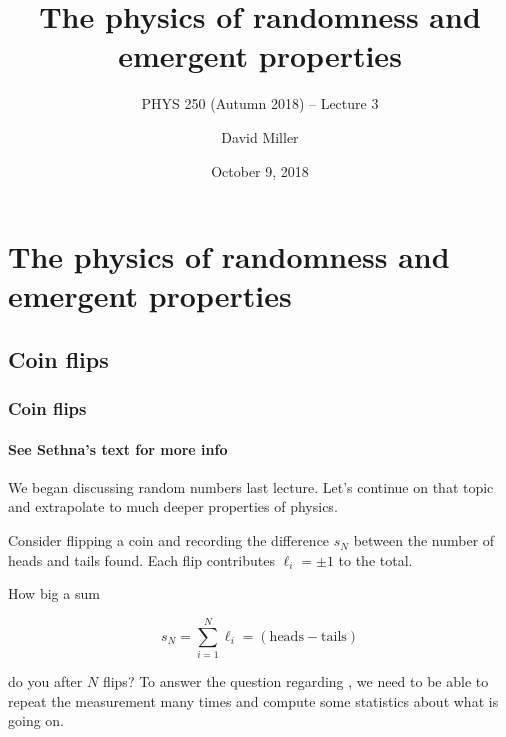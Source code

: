 \documentclass[hyperref={colorlinks=true}]{beamer}
\title[PHYS 250 (Autumn 2018) -- Lecture 3]{The physics of randomness and emergent properties}
\subtitle{PHYS 250 (Autumn 2018) -- Lecture 3}
\author[D.W.~Miller]{David Miller}
\institute[EFI, Chicago] 
{
  Department of Physics and the Enrico Fermi Institute\\
  University of Chicago
}
\date[October 9, 2018]{October 9, 2018}
\begin{document}

{
\begin{frame}
  \titlepage
\end{frame}
}

\section[The physics of randomness and emergent properties]{The physics of randomness and emergent properties}

\subsection[Coin flips]{Coin flips}

\begin{frame}%
  \frametitle{Coin flips}
  \framesubtitle{See Sethna's text for more info}
  
  We began discussing random numbers last lecture. Let's continue on that topic and extrapolate to much deeper properties of physics.
  
  \vspace{1cm}
  
  Consider flipping a coin and recording the difference $s_N$ between the number of heads and tails found. Each flip contributes $\ell_i = \pm 1$ to the total. 
  
  How big a sum 
  
  \begin{equation} 
    s_N = \sum_{i=1}^{N} \ell_i = \mathrm{(heads - tails)} 
  \end{equation}
  
  do you  after $N$ flips? To answer the question regarding , we need to be able to repeat the measurement many times and compute some statistics about what is going on.
  
\end{frame}
\end{document}
